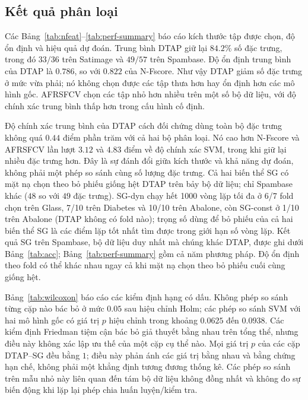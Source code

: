 \subsection{Kết quả phân loại}\label{ssec:results}
Các Bảng~\ref{tab:nfeat}--\ref{tab:perf-summary} báo cáo kích thước tập được chọn,
độ ổn định và hiệu quả dự đoán. Trung bình DTAP giữ lại $84.2\%$ số đặc trưng,
trong đó $33/36$ trên Satimage và $49/57$ trên Spambase.
Độ ổn định trung bình của DTAP là $0.786$, so với $0.822$ của N-Fscore.
Như vậy DTAP giảm số đặc trưng ở mức vừa phải; nó không chọn được các tập thưa hơn hay
ổn định hơn các mô hình gốc. AFRSFCV chọn các tập nhỏ hơn nhiều trên một số bộ dữ liệu,
với độ chính xác trung bình thấp hơn trong cấu hình cố định.

Độ chính xác trung bình của DTAP cách đối chứng dùng toàn bộ đặc trưng không quá $0.44$ điểm phần trăm
với cả hai bộ phân loại. Nó cao hơn N-Fscore và AFRSFCV lần lượt $3.12$
và $4.83$ điểm về độ chính xác SVM, trong khi giữ lại nhiều đặc trưng hơn.
Đây là sự đánh đổi giữa kích thước và khả năng dự đoán, không phải một phép so sánh cùng số lượng đặc trưng.
Cả hai biến thể SG có mặt nạ chọn theo bỏ phiếu giống hệt DTAP trên bảy bộ dữ liệu;
chỉ Spambase khác ($48$ so với $49$ đặc trưng).
SG-dyn chạy hết 1000 vòng lặp tối đa ở 6/7 fold chọn trên Glass,
7/10 trên Diabetes và 10/10 trên Abalone, còn SG-const ở 1/10 trên Abalone
(DTAP không có fold nào); trọng số dùng để bỏ phiếu của cả hai biến thể SG là các điểm lặp tốt nhất
tìm được trong giới hạn số vòng lặp. Kết quả SG trên Spambase, bộ dữ liệu duy nhất
mà chúng khác DTAP, được ghi dưới Bảng~\ref{tab:acc};
Bảng~\ref{tab:perf-summary} gồm cả năm phương pháp.
Độ ổn định theo fold có thể khác nhau ngay cả khi mặt nạ chọn theo bỏ phiếu cuối cùng giống hệt.

Bảng~\ref{tab:wilcoxon} báo cáo các kiểm định hạng có dấu. Không phép so sánh từng cặp nào
bác bỏ ở mức $0.05$ sau hiệu chỉnh Holm; các phép so sánh SVM với
hai mô hình gốc có giá trị $p$ hiệu chỉnh trong khoảng $0.0625$ đến $0.0938$.
Các kiểm định Friedman tiệm cận bác bỏ giả thuyết bằng nhau trên tổng thể, nhưng điều này không xác lập
ưu thế của một cặp cụ thể nào. Mọi giá trị $p$ của các cặp DTAP--SG đều bằng $1$;
điều này phản ánh các giá trị bằng nhau và bằng chứng hạn chế, không phải một khẳng định tương đương thống kê.
Các phép so sánh trên mẫu nhỏ này liên quan đến tám bộ dữ liệu không đồng nhất và không
đo sự biến động khi lặp lại phép chia huấn luyện/kiểm tra.

